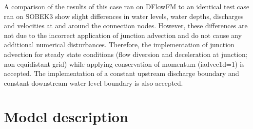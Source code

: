 A comparison of the results of this case ran on DFlowFM to an identical test case ran on SOBEK3 show slight differences in water levels, water depths, discharges and velocities at and around the connection nodes. However, these differences are not due to the incorrect application of junction advection and do not cause any additional numerical disturbances. Therefore, the implementation of junction advection for steady state conditions  (flow diversion and deceleration at junction; non-equidistant grid) while applying conservation of momentum (iadvec1d=1) is accepted. The implementation of a constant upstream discharge boundary and constant downstream water level boundary is also accepted.

\section*{Model description}

